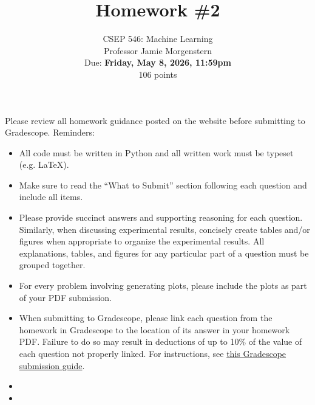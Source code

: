 \documentclass{article}
\begin{document}
\setcounter{aprob}{0}
\title{Homework \#2}
\author{
    \normalsize{CSEP 546: Machine Learning}\\
    \normalsize{Professor Jamie Morgenstern}\\
    \normalsize{Due: \textbf{Friday, May 8, 2026, 11:59pm}}\\
    \normalsize{106 points}
}
\date{{}}
\maketitle

\noindent Please review all homework guidance posted on the website before submitting to Gradescope. Reminders:
\begin{itemize}
    \item All code must be written in Python and all written work must be typeset (e.g. \LaTeX{}).
    \item Make sure to read the ``What to Submit'' section following each question and include all items.
    \item Please provide succinct answers and supporting reasoning for each question. Similarly, when discussing experimental results, concisely create tables and/or figures when appropriate to organize the experimental results. All explanations, tables, and figures for any particular part of a question must be grouped together.
    \item For every problem involving generating plots, please include the plots as part of your PDF submission.
    \item When submitting to Gradescope, please link each question from the homework in Gradescope to the location of its answer in your homework PDF. Failure to do so may result in deductions of up to 10\% of the value of each question not properly linked. For instructions, see \href{https://www.gradescope.com/get_started#student-submission}{this Gradescope submission guide}.
    \item {}
    \item {}
\end{itemize}
\end{document}
